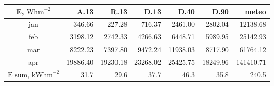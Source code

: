 \begin{tabular}{ | c | r r r r r r | } \hline
E, $\textrm{Whm}^{-2}$	&A.13	&R.13	&D.13	&D.40	&D.90	&meteo\\ \hline
jan		&346.66	&227.28	&716.37	&2461.00	&2802.04	&12138.68\\
feb		&3198.12	&2742.33	&4266.63	&6448.71	&5989.95	&25142.93\\
mar		&8222.23	&7397.80	&9472.24	&11938.03	&8717.90	&61764.12\\
apr		&19886.40	&19230.18	&23268.02	&25425.75	&18249.96	&141410.71\\ \hline
$\textrm{E_{sum}}$, $\textrm{kWhm}^{-2}$	&31.7	&29.6	&37.7	&46.3	&35.8	&240.5\\ \hline
\end{tabular}
